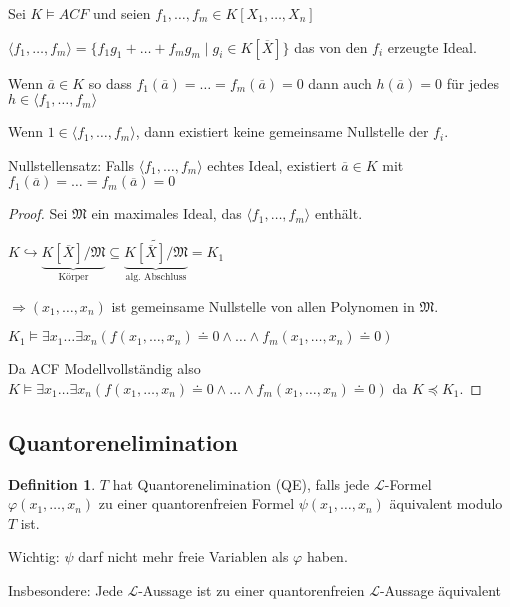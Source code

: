 \documentclass[12pt,parskip=full]{scrartcl}
\theoremstyle{definition}
\newtheorem{definition}[theorem]{Definition}
\begin{document}
	Sei $K \models ACF$ und seien $f_1, \dots, f_m \in K[X_1, \dots, X_n]$
	
	$\langle f_1, \dots, f_m \rangle = \{ f_1 g_1 + \dots + f_m g_m \mid g_i \in K[\overline{X}] \}$ das von den $f_i$ erzeugte Ideal.
	
	Wenn $\overline{a} \in K$ so dass $f_1(\overline{a}) = \dots = f_m(\overline{a})  = 0$ dann auch $h(\overline{a}) = 0$ für jedes $h \in \langle f_1, \dots, f_m \rangle$
	
	Wenn $1 \in \langle f_1, \dots, f_m \rangle$, dann existiert keine gemeinsame Nullstelle der $f_i$.
	
	Nullstellensatz: Falls $\langle f_1, \dots, f_m \rangle$ echtes Ideal, existiert $\overline{a} \in K$ mit $f_1(\overline{a}) = \dots = f_m(\overline{a}) = 0$
	
	\begin{proof}
		Sei $\mathfrak{M}$ ein maximales Ideal, das $\langle f_1, \dots, f_m \rangle$ enthält.
		
		$K \hookrightarrow \underbrace{K[\overline{X}]/\mathfrak{M}}_\text{Körper} \subseteq \underbrace{\tilde{K[\overline{X}]/\mathfrak{M}}}_\text{alg. Abschluss} = K_1$
		
		$\Rightarrow (x_1, \dots, x_n)$ ist gemeinsame Nullstelle von allen Polynomen in $\mathfrak{M}$.
		
		$K_1 \models \exists x_1 \dots \exists x_n (f(x_1, \dots, x_n) \doteq 0 \land \dots \land f_m(x_1, \dots, x_n) \doteq 0)$
		
		Da ACF Modellvollständig also $K \models \exists x_1 \dots \exists x_n (f(x_1, \dots, x_n) \doteq 0 \land \dots \land f_m(x_1, \dots, x_n) \doteq 0)$ da $K \preccurlyeq K_1$.
	\end{proof}

	\subsection{Quantorenelimination}
	
	\begin{definition}
		$T$ hat Quantorenelimination (QE), falls jede $\mathcal{L}$-Formel $\varphi(x_1, \dots, x_n)$ zu einer quantorenfreien Formel $\psi(x_1, \dots, x_n)$ äquivalent modulo $T$ ist.
		
		Wichtig: $\psi$ darf nicht mehr freie Variablen als $\varphi$ haben.
		
		Insbesondere: Jede $\mathcal{L}$-Aussage ist zu einer quantorenfreien $\mathcal{L}$-Aussage äquivalent
	\end{definition}
\end{document}
